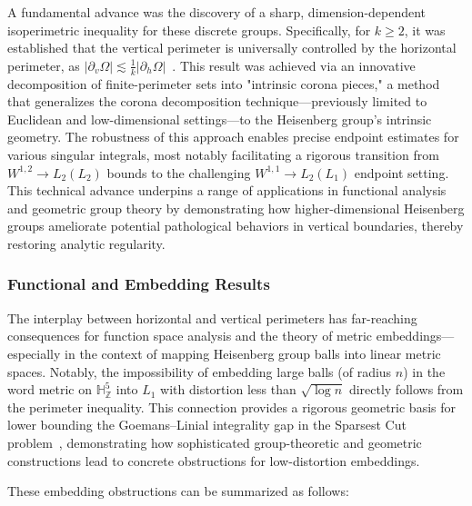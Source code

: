 \documentclass[sigconf]{acmart}
\begin{document}
A fundamental advance was the discovery of a sharp, dimension-dependent isoperimetric inequality for these discrete groups. Specifically, for $k \geq 2$, it was established that the vertical perimeter is universally controlled by the horizontal perimeter, as $|\partial_{v}\Omega| \lesssim \frac{1}{k} |\partial_{h}\Omega|$~\cite{ref108}. This result was achieved via an innovative decomposition of finite-perimeter sets into "intrinsic corona pieces," a method that generalizes the corona decomposition technique—previously limited to Euclidean and low-dimensional settings—to the Heisenberg group's intrinsic geometry. The robustness of this approach enables precise endpoint estimates for various singular integrals, most notably facilitating a rigorous transition from $W^{1,2} \to L_2(L_2)$ bounds to the challenging $W^{1,1} \to L_2(L_1)$ endpoint setting. This technical advance underpins a range of applications in functional analysis and geometric group theory by demonstrating how higher-dimensional Heisenberg groups ameliorate potential pathological behaviors in vertical boundaries, thereby restoring analytic regularity.

\subsubsection{Functional and Embedding Results}

The interplay between horizontal and vertical perimeters has far-reaching consequences for function space analysis and the theory of metric embeddings—especially in the context of mapping Heisenberg group balls into linear metric spaces. Notably, the impossibility of embedding large balls (of radius $n$) in the word metric on $\mathbb{H}^5_{\mathbb{Z}}$ into $L_1$ with distortion less than $\sqrt{\log n}$ directly follows from the perimeter inequality. This connection provides a rigorous geometric basis for lower bounding the Goemans–Linial integrality gap in the Sparsest Cut problem~\cite{ref108}, demonstrating how sophisticated group-theoretic and geometric constructions lead to concrete obstructions for low-distortion embeddings.

These embedding obstructions can be summarized as follows:
\end{document}
